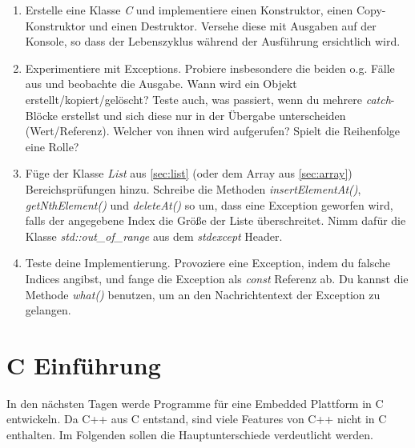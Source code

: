 \documentclass[
  accentcolor=tud1c,	%
  colorbacktitle,		%
  inverttitle,			%
  german,				%
  twoside
]{tudexercise}
\begin{document}
\begin{enumerate}
\item 
Erstelle eine Klasse \emph{C} und implementiere einen Konstruktor, einen Copy-Konstruktor und einen Destruktor.
Versehe diese mit Ausgaben auf der Konsole, so dass der Lebenszyklus während der Ausführung ersichtlich wird.

\item 
Experimentiere mit Exceptions.
Probiere insbesondere die beiden o.g. Fälle aus und beobachte die Ausgabe. 
Wann wird ein Objekt erstellt/kopiert/gelöscht? 
Teste auch, was passiert, wenn du mehrere \emph{catch}-Blöcke erstellst und sich diese nur in der Übergabe unterscheiden (Wert/Referenz). Welcher von ihnen wird aufgerufen?
Spielt die Reihenfolge eine Rolle?

\item
Füge der Klasse \emph{List} aus \ref{sec:list} (oder dem Array aus \ref{sec:array}) Bereichsprüfungen hinzu.
Schreibe die Methoden \emph{insertElementAt()}, \emph{getNthElement()} und \emph{deleteAt()} so um, dass eine Exception geworfen wird, falls der angegebene Index die Größe der Liste überschreitet. 
Nimm dafür die Klasse \emph{std::out\_of\_range} aus dem \emph{stdexcept} Header.

\item
Teste deine Implementierung.
Provoziere eine Exception, indem du falsche Indices angibst, und fange die Exception als \emph{const} Referenz ab. Du kannst die Methode \emph{what()} benutzen, um an den Nachrichtentext der Exception zu gelangen.

\end{enumerate}


\section{C Einführung}
In den nächsten Tagen werde Programme für eine Embedded Plattform in C entwickeln. 
Da C++ aus C entstand, sind viele Features von C++ nicht in C enthalten. Im Folgenden sollen die Hauptunterschiede verdeutlicht werden.
\end{document}
